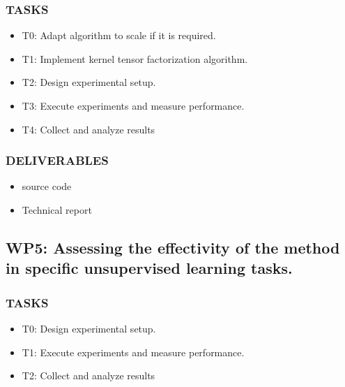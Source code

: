 \documentclass[letterpaper,12pt]{article}
\begin{document}
\subsubsection*{TASKS}
\begin{itemize}
\item T0: Adapt algorithm to scale if it is required.
\item T1: Implement kernel tensor factorization algorithm.
\item T2: Design experimental setup.
\item T3: Execute experiments and measure performance.
\item T4: Collect and analyze results
\end{itemize}
\subsubsection*{DELIVERABLES}
\begin{itemize}
 \item source code
 \item Technical report
\end{itemize}



\subsection*{WP5: Assessing the effectivity of the method in specific unsupervised learning tasks.}
\subsubsection*{TASKS}
\begin{itemize}
\item T0: Design experimental setup.
\item T1: Execute experiments and measure performance.
\item T2: Collect and analyze results
\end{itemize}
\end{document}
